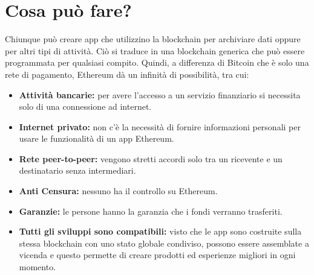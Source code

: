 \documentclass[a4paper,11pt]{report}
\begin{document}
\section{Cosa può fare?}
Chiunque può creare app che utilizzino la blockchain per archiviare dati oppure per altri tipi di attività. Ciò si traduce in una blockchain generica che può essere programmata per qualsiasi compito. Quindi, a differenza di Bitcoin che è solo una rete di pagamento, Ethereum dà un infinità di possibilità, tra cui: 
\begin{itemize} %
\item \textbf{Attività bancarie:} per avere l'accesso a un servizio finanziario si necessita solo di una connessione ad internet. 
\item \textbf{Internet privato:} non c'è la necessità di fornire informazioni personali per usare le funzionalità di un app Ethereum.
\item \textbf{Rete peer-to-peer:} vengono stretti accordi solo tra un ricevente e un destinatario senza intermediari.
\item \textbf{Anti Censura:} nessuno ha il controllo su Ethereum.
\item \textbf{Garanzie:} le persone hanno la garanzia che i fondi verranno trasferiti.
\item \textbf{Tutti gli sviluppi sono compatibili:} visto che le app sono costruite sulla stessa blockchain con uno stato globale condiviso, possono essere assemblate a vicenda e questo permette di creare prodotti ed esperienze migliori in ogni momento. 
\end{itemize}
\end{document}
